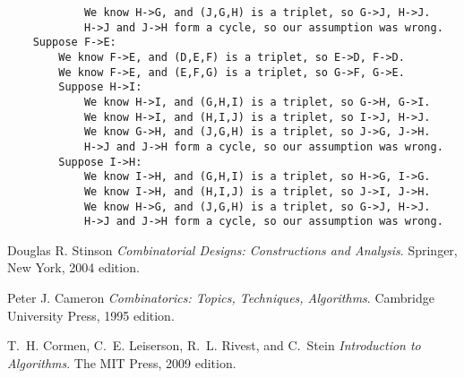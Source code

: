 \documentclass[12pt,x11names, rgb]{article}
\begin{document}
\begin{verbatim}
            We know H->G, and (J,G,H) is a triplet, so G->J, H->J.
            H->J and J->H form a cycle, so our assumption was wrong.
    Suppose F->E:
        We know F->E, and (D,E,F) is a triplet, so E->D, F->D.
        We know F->E, and (E,F,G) is a triplet, so G->F, G->E.
        Suppose H->I:
            We know H->I, and (G,H,I) is a triplet, so G->H, G->I.
            We know H->I, and (H,I,J) is a triplet, so I->J, H->J.
            We know G->H, and (J,G,H) is a triplet, so J->G, J->H.
            H->J and J->H form a cycle, so our assumption was wrong.
        Suppose I->H:
            We know I->H, and (G,H,I) is a triplet, so H->G, I->G.
            We know I->H, and (H,I,J) is a triplet, so J->I, J->H.
            We know H->G, and (J,G,H) is a triplet, so G->J, H->J.
            H->J and J->H form a cycle, so our assumption was wrong.
\end{verbatim}

\begin{thebibliography}{9}

    Douglas R. Stinson
    \emph{Combinatorial Designs: Constructions and Analysis}.
    Springer, New York,
    2004 edition.

    Peter J. Cameron
    \emph{Combinatorics: Topics, Techniques, Algorithms}.
    Cambridge University Press,
    1995 edition.

    T.~H. Cormen, C.~E. Leiserson, R.~L. Rivest, and C.~Stein
    \emph{Introduction to Algorithms}.
    The MIT Press,
    2009 edition.


\end{thebibliography}
\end{document}
